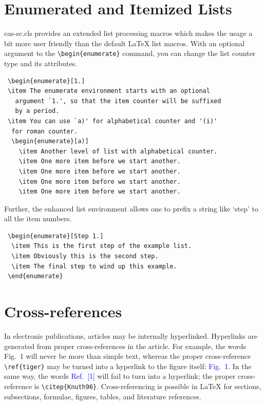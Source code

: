 \documentclass[a4paper,fleqn]{cas-sc}
\begin{document}
\section[Enumerated ...]{Enumerated and Itemized Lists}
{cas-sc.cls} provides an extended list processing macros
which makes the usage a bit more user friendly than the default
\LaTeX{} list macros.   With an optional argument to the
\verb+\begin{enumerate}+ command, you can change the list counter
type and its attributes.

\begin{verbatim}
 \begin{enumerate}[1.]
 \item The enumerate environment starts with an optional
   argument `1.', so that the item counter will be suffixed
   by a period.
 \item You can use `a)' for alphabetical counter and '(i)' 
  for roman counter.
  \begin{enumerate}[a)]
    \item Another level of list with alphabetical counter.
    \item One more item before we start another.
    \item One more item before we start another.
    \item One more item before we start another.
    \item One more item before we start another.
\end{verbatim}

Further, the enhanced list environment allows one to prefix a
string like `step' to all the item numbers.  

\begin{verbatim}
 \begin{enumerate}[Step 1.]
  \item This is the first step of the example list.
  \item Obviously this is the second step.
  \item The final step to wind up this example.
 \end{enumerate}
\end{verbatim}

\section{Cross-references}
In electronic publications, articles may be internally
hyperlinked. Hyperlinks are generated from proper
cross-references in the article.  For example, the words
\textcolor{black!80}{Fig.~1} will never be more than simple text,
whereas the proper cross-reference \verb+\ref{tiger}+ may be
turned into a hyperlink to the figure itself:
\textcolor{blue}{Fig.~1}.  In the same way,
the words \textcolor{blue}{Ref.~[1]} will fail to turn into a
hyperlink; the proper cross-reference is \verb+\citep{Knuth96}+.
Cross-referencing is possible in \LaTeX{} for sections,
subsections, formulae, figures, tables, and literature
references.
\end{document}
